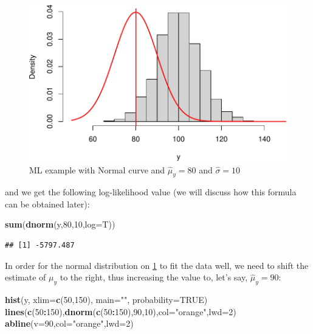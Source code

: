 \documentclass[
]{book}
\newenvironment{Shaded}{\begin{snugshade}}{\end{snugshade}}
\newcommand{\DataTypeTok}[1]{\textcolor[rgb]{0.13,0.29,0.53}{#1}}
\newcommand{\DecValTok}[1]{\textcolor[rgb]{0.00,0.00,0.81}{#1}}
\newcommand{\KeywordTok}[1]{\textcolor[rgb]{0.13,0.29,0.53}{\textbf{#1}}}
\newcommand{\NormalTok}[1]{#1}
\newcommand{\OperatorTok}[1]{\textcolor[rgb]{0.81,0.36,0.00}{\textbf{#1}}}
\newcommand{\OtherTok}[1]{\textcolor[rgb]{0.56,0.35,0.01}{#1}}
\newcommand{\StringTok}[1]{\textcolor[rgb]{0.31,0.60,0.02}{#1}}
\theoremstyle{definition}
\theoremstyle{definition}
\theoremstyle{definition}
\theoremstyle{definition}
\theoremstyle{remark}
\begin{document}
\begin{figure}
\centering
\includegraphics{Svetunkov---Statistics-for-Business-Analytics_files/figure-latex/MLENormalExample01-1.pdf}
\caption{\label{fig:MLENormalExample01}ML example with Normal curve and \(\hat{\mu}_y=80\) and \(\hat{\sigma}=10\)}
\end{figure}

and we get the following log-likelihood value (we will discuss how this formula can be obtained later):

\begin{Shaded}
\begin{Highlighting}[]
\KeywordTok{sum}\NormalTok{(}\KeywordTok{dnorm}\NormalTok{(y,}\DecValTok{80}\NormalTok{,}\DecValTok{10}\NormalTok{,}\DataTypeTok{log=}\NormalTok{T))}
\end{Highlighting}
\end{Shaded}

\begin{verbatim}
## [1] -5797.487
\end{verbatim}

In order for the normal distribution on \ref{fig:MLENormalExample01} to fit the data well, we need to shift the estimate of \(\mu_y\) to the right, thus increasing the value to, let's say, \(\hat{\mu}_y=90\):

\begin{Shaded}
\begin{Highlighting}[]
\KeywordTok{hist}\NormalTok{(y, }\DataTypeTok{xlim=}\KeywordTok{c}\NormalTok{(}\DecValTok{50}\NormalTok{,}\DecValTok{150}\NormalTok{), }\DataTypeTok{main=}\StringTok{""}\NormalTok{, }\DataTypeTok{probability=}\OtherTok{TRUE}\NormalTok{)}
\KeywordTok{lines}\NormalTok{(}\KeywordTok{c}\NormalTok{(}\DecValTok{50}\OperatorTok{:}\DecValTok{150}\NormalTok{),}\KeywordTok{dnorm}\NormalTok{(}\KeywordTok{c}\NormalTok{(}\DecValTok{50}\OperatorTok{:}\DecValTok{150}\NormalTok{),}\DecValTok{90}\NormalTok{,}\DecValTok{10}\NormalTok{),}\DataTypeTok{col=}\StringTok{"orange"}\NormalTok{,}\DataTypeTok{lwd=}\DecValTok{2}\NormalTok{)}
\KeywordTok{abline}\NormalTok{(}\DataTypeTok{v=}\DecValTok{90}\NormalTok{,}\DataTypeTok{col=}\StringTok{"orange"}\NormalTok{,}\DataTypeTok{lwd=}\DecValTok{2}\NormalTok{)}
\end{Highlighting}
\end{Shaded}
\end{document}
